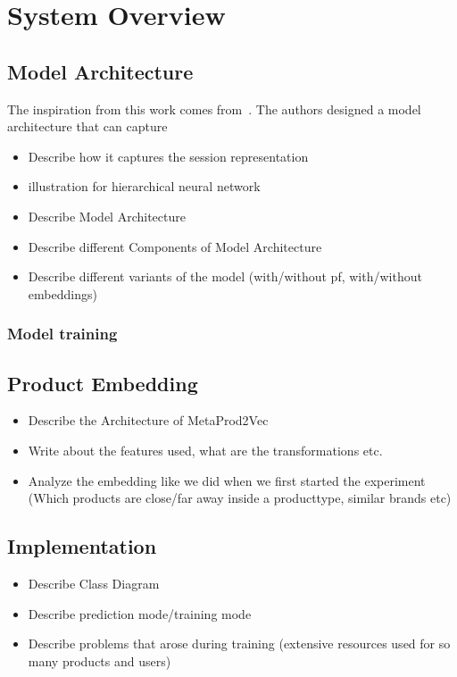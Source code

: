 \chapter{System Overview}

\section{Model Architecture}\label{model_arch}
The inspiration from this work comes from~\cite{hierarchical}.
The authors designed a model architecture that can capture 
\begin{itemize}
\item Describe how it captures the session representation
\item illustration for hierarchical neural network
\item Describe Model Architecture
\item Describe different Components of Model Architecture
\item Describe different variants of the model (with/without pf, with/without embeddings)
\end{itemize}
\subsection{Model training}
\section{Product Embedding}
\begin{itemize}
    \item Describe the Architecture of MetaProd2Vec
    \item Write about the features used, what are the transformations etc.
    \item Analyze the embedding like we did when we first started the experiment (Which products are close/far away inside a producttype, similar brands etc)
\end{itemize}

\section{Implementation}

\begin{itemize}
\item Describe Class Diagram
\item Describe prediction mode/training mode
\item Describe problems that arose during training (extensive resources used for so many products and users)
\end{itemize}
